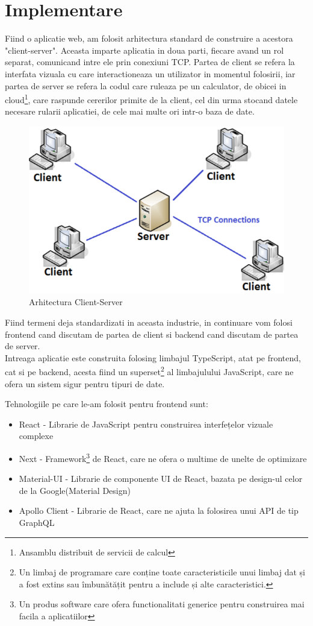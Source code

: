\documentclass[12pt, a4paper, oneside, romanian]{teza-upb}
\begin{document}
\chapter{Implementare}

Fiind o aplicatie web, am folosit arhitectura standard de construire a acestora "client-server". Aceasta imparte aplicatia in doua parti, fiecare avand un rol separat, comunicand intre ele prin conexiuni TCP. Partea de client se refera la interfata vizuala cu care interactioneaza un utilizator in momentul folosirii, iar partea de server se refera la codul care ruleaza pe un calculator, de obicei in cloud\footnote{Ansamblu distribuit de servicii de calcul}, care raspunde cererilor primite de la client, cel din urma stocand datele necesare rularii aplicatiei, de cele mai multe ori intr-o baza de date.

\begin{figure}[H]
\centering
\includegraphics*[width=0.7\columnwidth]{arhitectura-client-server}
\caption{Arhitectura Client-Server\cite{clientserverarchitecture}}
\label{arhitectura-client-server}
\end{figure}

Fiind termeni deja standardizati in aceasta industrie, in continuare vom folosi frontend cand discutam de partea de client si backend cand discutam de partea de server. \\

Intreaga aplicatie este construita folosing limbajul TypeScript, atat pe frontend, cat si pe backend, acesta fiind un superset\footnote{Un limbaj de programare care conține toate caracteristicile unui limbaj dat și a fost extins sau îmbunătățit pentru a include și alte caracteristici.} al limbajulului JavaScript, care ne ofera un sistem sigur pentru tipuri de date.

Tehnologiile pe care le-am folosit pentru frontend sunt:
\begin{itemize}
	\item React - Librarie de JavaScript pentru construirea interfețelor vizuale complexe
	\item Next - Framework\footnote{Un produs software care ofera functionalitati generice pentru construirea mai facila a aplicatiilor} de React, care ne ofera o multime de unelte de optimizare
	\item Material-UI - Librarie de componente UI de React, bazata pe design-ul celor de la Google(Material Design)
	\item Apollo Client - Librarie de React, care ne ajuta la folosirea unui API de tip GraphQL
\end{itemize}
\end{document}
